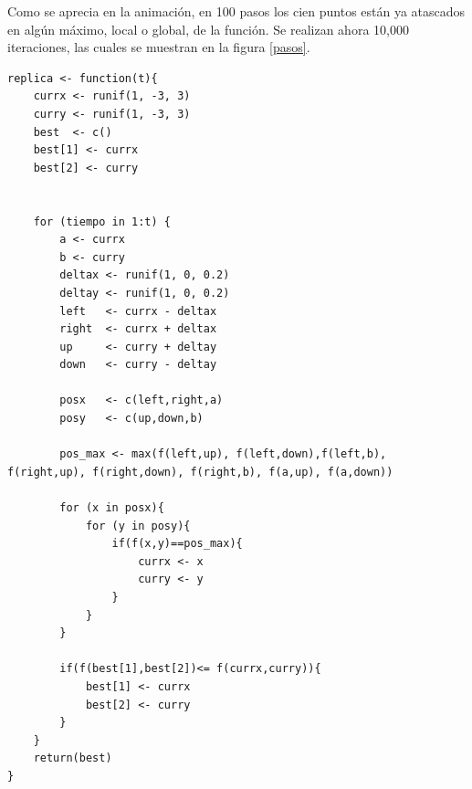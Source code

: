 \documentclass[12pt,letterpaper]{article}
\begin{document}
Como se aprecia en la animación, en 100 pasos los cien puntos están ya atascados en algún máximo, local o global, de la función. Se realizan ahora 10,000 iteraciones, las cuales se muestran en la figura \ref{pasos}. 

\begin{lstlisting}[label=lst:gc1,caption=Función \texttt{replica}., frame = single]
replica <- function(t){ 
    currx <- runif(1, -3, 3)
    curry <- runif(1, -3, 3)
    best  <- c()
    best[1] <- currx
    best[2] <- curry
    

    for (tiempo in 1:t) {
        a <- currx
        b <- curry
        deltax <- runif(1, 0, 0.2)
        deltay <- runif(1, 0, 0.2)
        left   <- currx - deltax
        right  <- currx + deltax
        up     <- curry + deltay
        down   <- curry - deltay

        posx   <- c(left,right,a)
        posy   <- c(up,down,b)
        
        pos_max <- max(f(left,up), f(left,down),f(left,b), f(right,up), f(right,down), f(right,b), f(a,up), f(a,down))
        
        for (x in posx){
            for (y in posy){
                if(f(x,y)==pos_max){
                    currx <- x
                    curry <- y
                }
            }
        }
        
        if(f(best[1],best[2])<= f(currx,curry)){
            best[1] <- currx
            best[2] <- curry
        }
    }
    return(best)
}
    
\end{lstlisting} 
\end{document}
